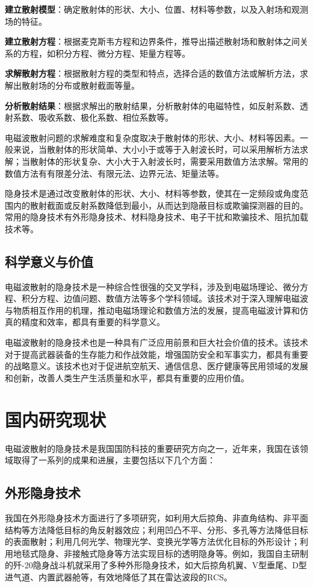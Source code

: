 \documentclass{article}
\begin{document}
\textbf{建立散射模型}：确定散射体的形状、大小、位置、材料等参数，以及入射场和观测场的特征。

\textbf{建立散射方程}：根据麦克斯韦方程和边界条件，推导出描述散射场和散射体之间关系的方程，如积分方程、微分方程、矩量方程等。

\textbf{求解散射方程}：根据散射方程的类型和特点，选择合适的数值方法或解析方法，求解出散射场的分布或散射截面等量。

\textbf{分析散射结果}：根据求解出的散射结果，分析散射体的电磁特性，如反射系数、透射系数、吸收系数、极化系数、相位系数等。

电磁波散射问题的求解难度和复杂度取决于散射体的形状、大小、材料等因素。一般来说，当散射体的形状简单、大小小于或等于入射波长时，可以采用解析方法求解；当散射体的形状复杂、大小大于入射波长时，需要采用数值方法求解。常用的数值方法有有限差分法、有限元法、边界元法、矩量法等。

隐身技术是通过改变散射体的形状、大小、材料等参数，使其在一定频段或角度范围内的散射截面或反射系数降低到最小，从而达到隐蔽目标或欺骗探测器的目的。常用的隐身技术有外形隐身技术、材料隐身技术、电子干扰和欺骗技术、阻抗加载技术等。

\subsection{科学意义与价值}
电磁波散射的隐身技术是一种综合性很强的交叉学科，涉及到电磁场理论、微分方程、积分方程、边值问题、数值方法等多个学科领域。该技术对于深入理解电磁波与物质相互作用的机理，推动电磁场理论和数值方法的发展，提高电磁波计算和仿真的精度和效率，都具有重要的科学意义。

电磁波散射的隐身技术也是一种具有广泛应用前景和巨大社会价值的技术。该技术对于提高武器装备的生存能力和作战效能，增强国防安全和军事实力，都具有重要的战略意义。该技术也对于促进航空航天、通信信息、医疗健康等民用领域的发展和创新，改善人类生产生活质量和水平，都具有重要的应用价值。

\section{国内研究现状}
电磁波散射的隐身技术是我国国防科技的重要研究方向之一，近年来，我国在该领域取得了一系列的成果和进展，主要包括以下几个方面：

\subsection{外形隐身技术}
我国在外形隐身技术方面进行了多项研究，如利用大后掠角、非直角结构、非平面结构等方法降低目标的角反射器效应；利用凹凸不平、分形、多孔等方法降低目标的表面散射；利用几何光学、物理光学、变换光学等方法优化目标的外形设计；利用地毯式隐身、非接触式隐身等方法实现目标的透明隐身等。例如，我国自主研制的歼-20隐身战斗机就采用了多种外形隐身技术，如大后掠角机翼、V型垂尾、D型进气道、内置武器舱等，有效地降低了其在雷达波段的RCS。
\end{document}
